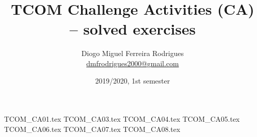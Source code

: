 \documentclass{tcom}
\title{TCOM Challenge Activities (CA) -- solved exercises}
\author{Diogo Miguel Ferreira Rodrigues \\ \href{mailto:dmfrodrigues2000@gmail.com}{dmfrodrigues2000@gmail.com}}
\date{2019/2020, 1st semester}
\begin{document}
\maketitle
\tableofcontents
{TCOM_CA01.tex}
{TCOM_CA03.tex}
{TCOM_CA04.tex}
{TCOM_CA05.tex}
{TCOM_CA06.tex}
{TCOM_CA07.tex}
{TCOM_CA08.tex}
\end{document}
